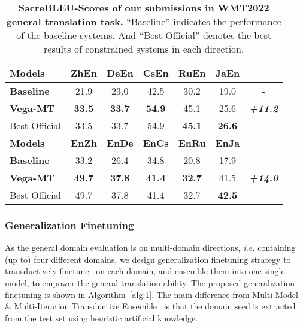 \documentclass[11pt,a4paper]{article}
\newcommand{\zct}{\color{black}}
\begin{document}
\begin{table*}[t!]
    \centering 
    \begin{tabular}{lcccccc}
    \toprule 
    \textbf{Models}        & \textbf{ZhEn} & \textbf{DeEn} & \textbf{CsEn} & \textbf{RuEn} & \textbf{JaEn} & \textbf{} \\\hline
    \textbf{Baseline}      & 21.9            & 23.0            & 42.5            & 30.2            & 19.0     & -\\
    \textbf{Vega-MT}    & \textbf{33.5}   & \textbf{33.7}   & \textbf{54.9}   & 45.1            & 25.6        &\textit{\textbf{+11.2}}\\\hdashline
    {Best Official} & 33.5            & 33.7            & 54.9            &\bf 45.1            &\bf 26.6     & \\\midrule
    \textbf{Models}        & \textbf{EnZh} & \textbf{EnDe} & \textbf{EnCs} & \textbf{EnRu} & \textbf{EnJa} & \textbf{}\\\hline
    \textbf{Baseline}      & 33.2            & 26.4            & 34.8            & 20.8            & 17.9     & -\\
    \textbf{Vega-MT}    & \textbf{49.7}   & \textbf{37.8}   & \textbf{41.4}   & \textbf{32.7}   & 41.5        &\textit{\textbf{+14.0}}\\\hdashline
    {Best Official} & 49.7            & 37.8            & 41.4            & 32.7            &\bf 42.5     & \\
    \bottomrule
    \end{tabular}
    \caption{\label{tab:sacrebleu} \textbf{SacreBLEU-Scores of our submissions in WMT2022 general translation task.} ``Baseline'' indicates the performance of the baseline systems. And ``Best Official'' denotes the best results {\zct of constrained systems} in each direction.}
\end{table*}

\subsubsection{Generalization Finetuning}
\label{ssec:general-ft}
As the general domain evaluation is on multi-domain directions, \textit{i.e.} containing (up to) four different domains, we design generalization finetuning strategy to transductively finetune~\cite{Wang2020TransductiveEL} on each domain, and ensemble them into one single model, to empower the general translation ability. 
The proposed generalization finetuning is shown in Algorithm~\ref{alg:1}.
The main difference from Multi-Model \& Multi-Iteration Transductive Ensemble~\cite{wang-etal-2021-tencent} is that the  domain seed  is extracted from the test set using heuristic artificial knowledge. 
\end{document}
